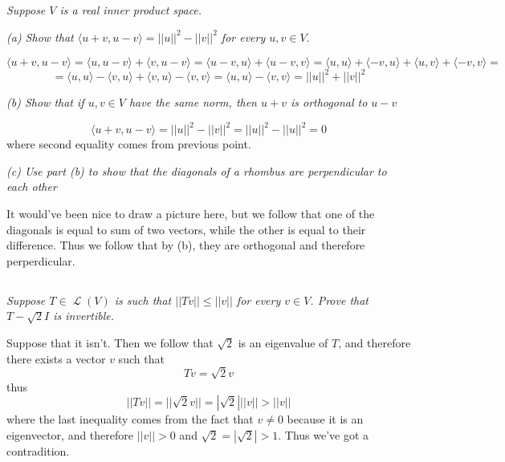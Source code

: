 \documentclass[11pt,oneside,titlepage]{book}
\DeclareMathOperator \map {\mathcal {L}}
\begin{document}
\subsection{}

\textit{Suppose $V$ is a real inner product space.}

\textit{(a) Show that $\langle u + v, u - v\rangle = ||u||^2 - ||v||^2$ for every
$u, v \in V$.}

$$\langle u + v, u - v\rangle = \langle u, u - v\rangle + \langle v, u - v\rangle =
\langle u - v, u \rangle + \langle u - v, v\rangle =
\langle u, u \rangle + \langle - v, u \rangle + \langle u, v\rangle +
\langle - v, v\rangle  = $$
$$ = \langle u, u \rangle - \langle v, u \rangle + \langle v, u\rangle -
\langle v, v\rangle =
\langle u, u \rangle  - \langle v, v\rangle =  ||u||^2 + ||v||^2$$

\textit{(b) Show that if $u, v \in V$ have the same norm, then $u + v$ is orthogonal to
  $u - v$}

$$\langle u + v, u - v \rangle = ||u||^2 - ||v||^2 = ||u||^2 - ||u||^2 = 0$$
where second equality comes from previous point.

\textit{(c) Use part (b) to show that the diagonals of a rhombus are perpendicular to each other}

It would've been nice to draw a picture here, but we follow that one of the diagonals
is equal to sum of two vectors, while the other is equal to their difference. Thus we
follow that by (b), they are orthogonal and therefore perperdicular.

\subsection{}

\textit{Suppose $T \in \map(V)$ is such that $||Tv|| \leq ||v||$ for every $v \in V$. Prove that
  $T - \sqrt{2}I$ is invertible.}

Suppose that it isn't. Then we follow that $\sqrt{2}$ is an eigenvalue of $T$, and therefore
there exists a vector $v$ such that
$$Tv = \sqrt{2} v$$
thus
$$||Tv|| = ||\sqrt{2}v|| = |\sqrt{2}| ||v|| > ||v||$$
where the last inequality comes from the fact that $v \neq 0$ because it is an eigenvector, and
therefore $||v|| > 0$ and $\sqrt{2} = |\sqrt{2}| > 1$. Thus we've got a contradition.

\subsection{}
\end{document}

